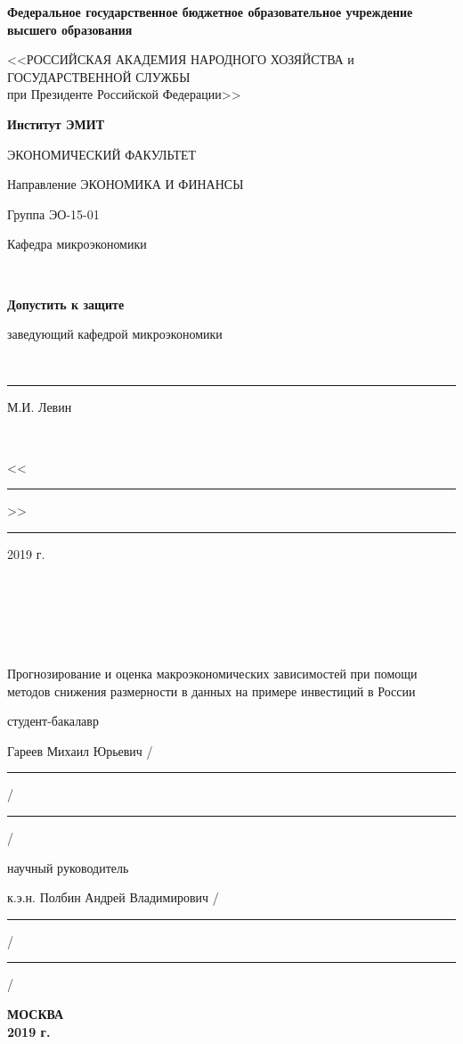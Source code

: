 



\begingroup
{}   %
\begin{center}
\small \bfseries Федеральное государственное бюджетное образовательное учреждение высшего образования

<<РОССИЙСКАЯ АКАДЕМИЯ НАРОДНОГО ХОЗЯЙСТВА и\\ ГОСУДАРСТВЕННОЙ СЛУЖБЫ \\
при Президенте Российской Федерации>>

\vspace{2ex}

\bfseries
Институт ЭМИТ

ЭКОНОМИЧЕСКИЙ ФАКУЛЬТЕТ

Направление  ЭКОНОМИКА И ФИНАНСЫ
\end{center}

\vfill


\noindent  Группа ЭО-15-01
\hfill
\parbox[t]{20em}{\centering
Кафедра микроэкономики

\mbox{ }

\textbf{Допустить к защите}

заведующий кафедрой микроэкономики

\mbox{ }

\rule{8em}{0.5pt} М.И. Левин

\mbox{ }

<<\rule{2em}{0.5pt}>> \rule{5em}{0.5pt} 2019 г. }

\mbox{ }

\mbox{ }


\mbox{ }

\begin{center}
{\large
Прогнозирование и оценка макроэкономических зависимостей при помощи методов снижения размерности в данных на примере инвестиций в России}
\end{center}

\vfill

\noindent\normalsize
студент-бакалавр

\noindent
Гареев Михаил Юрьевич
\hfill /\rule{6em}{0.5pt}/\rule{6em}{0.5pt}/

\hfill{}

\noindent
научный руководитель 

\noindent
к.э.н. Полбин Андрей Владимирович
\hfill /\rule{6em}{0.5pt}/\rule{6em}{0.5pt}/

\hfill{}


\vfill

\begin{center}
\normalsize \bfseries МОСКВА \\ 2019 г.
\end{center}
\endgroup

